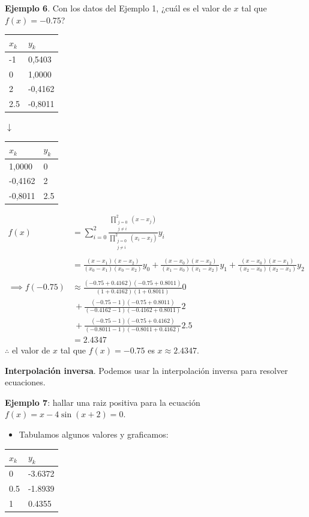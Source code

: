 \documentclass[openany]{book}
\providecommand{\tightlist}{%
  \setlength{\itemsep}{0pt}\setlength{\parskip}{0pt}}
\begin{document}
\textbf{Ejemplo 6}. Con los datos del Ejemplo 1, ¿cuál es el valor de \(x\) tal que \(f(x)=-0.75\)?

\begin{longtable}[]{@{}ll@{}}
\toprule
\(x_k\) & \(y_k\)\tabularnewline
\midrule
\endhead
-1 & 0,5403\tabularnewline
0 & 1,0000\tabularnewline
2 & -0,4162\tabularnewline
2.5 & -0,8011\tabularnewline
\bottomrule
\end{longtable}

\(\downarrow\)

\begin{longtable}[]{@{}ll@{}}
\toprule
\(x_k\) & \(y_k\)\tabularnewline
\midrule
\endhead
1,0000 & 0\tabularnewline
-0,4162 & 2\tabularnewline
-0,8011 & 2.5\tabularnewline
\bottomrule
\end{longtable}

\[
\begin{split}
f(x) &= \sum_{i = 0}^2 \frac{\prod\limits_{\substack{j = 0\\ j \neq i}}^2 (x - x_j)}{\prod\limits_{\substack{j = 0\\ j \neq i}}^2 (x_i - x_j)} y_i \\ \\
&= \frac{(x - x_1)(x - x_2)}{(x_0 - x_1)(x_0 - x_2)} y_0 + \frac{(x - x_0)(x - x_2)}{(x_1 - x_0)(x_1 - x_2)} y_1 + \frac{(x - x_0)(x - x_1)}{(x_2 - x_0)(x_2 - x_1)} y_2 \\ \\
\implies f(-0.75) &\approx \frac{(-0.75+0.4162)(-0.75+0.8011)}{(1+0.4162)(1+0.8011)} 0 \\
&~ + \frac{(-0.75-1)(-0.75+0.8011)}{(-0.4162-1)(-0.4162+0.8011)} 2 \\
&~ + \frac{(-0.75-1)(-0.75+0.4162)}{(-0.8011-1)(-0.8011+0.4162)} 2.5  \\
&= 2.4347
\end{split}
\]
\(\therefore\) el valor de \(x\) tal que \(f(x)=-0.75\) es \(x \approx 2.4347\).

\textbf{Interpolación inversa}. Podemos usar la interpolación inversa para resolver ecuaciones.

\textbf{Ejemplo 7}: hallar una raiz positiva para la ecuación \(f(x)=x-4\sin(x+2) = 0\).

\begin{itemize}
\tightlist
\item
  Tabulamos algunos valores y graficamos:
\end{itemize}

\begin{longtable}[]{@{}ll@{}}
\toprule
\(x_k\) & \(y_k\)\tabularnewline
\midrule
\endhead
0 & -3.6372\tabularnewline
0.5 & -1.8939\tabularnewline
1 & 0.4355\tabularnewline
\bottomrule
\end{longtable}
\end{document}

